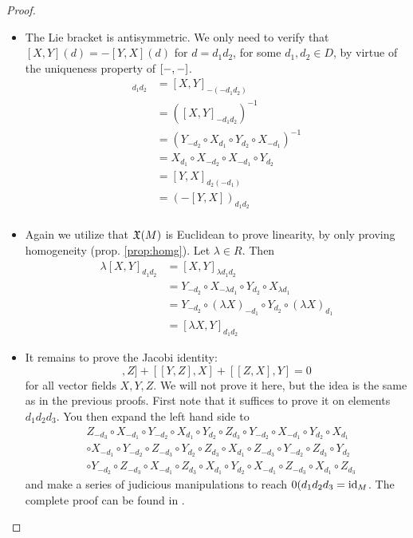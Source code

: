 \begin{proof}
  \begin{itemize}
    \item The Lie bracket is antisymmetric. We only need to verify that \( [X,Y](d) = -[Y,X](d) \) for \( d = d_1d_2 \), for some \( d_1,d_2\in D \), by virtue of the uniqueness property of \( [-,-] \).
      \begin{align*}
	[X,Y]_{d_1d_2} &= [X,Y]_{-(-d_1d_2)}                                                   \\
		       &= \left( [X,Y]_{-d_1d_2} \right)^{-1}                                  \\
		       &= \left( Y_{-d_2}\circ X_{d_1}\circ Y_{d_2}\circ X_{-d_1} \right)^{-1} \\
		       &= X_{d_1}\circ X_{-d_2}\circ X_{-d_1}\circ Y_{d_2}                     \\
		       &= [Y,X]_{d_2(-d_1)}                                                    \\
		       &= \left( -[Y,X] \right)_{d_1d_2}                                       \\
      \end{align*}
    \item Again we utilize that \( \mathfrak X(M) \) is Euclidean to prove linearity, by only proving homogeneity (prop. \ref{prop:homg}). Let \( \lambda\in R \). Then
      \begin{align*}
	\lambda[X,Y]_{d_1d_2} &= [X,Y]_{\lambda d_1d_2}                                               \\
	                      &= Y_{-d_2}\circ X_{-\lambda d_1}\circ Y_{d_2}\circ X_{\lambda d_1}     \\
			      &= Y_{-d_2}\circ (\lambda X)_{-d_1}\circ Y_{d_2}\circ (\lambda X)_{d_1} \\
			      &= [\lambda X,Y]_{d_1d_2}
      \end{align*}
    \item It remains to prove the Jacobi identity:
      \begin{equation*}
	[[X,Y],Z] + [[Y,Z],X] + [[Z,X],Y] = 0
      \end{equation*}
      for all vector fields \( X,Y,Z \). We will not prove it here, but the idea is the same as in the previous proofs. First note that it suffices to prove it on elements \( d_1d_2d_3 \). You then expand the left hand side to
      \begin{align*}
	&Z_{-d_3}\circ X_{-d_1}\circ Y_{-d_2}\circ X_{d_1}\circ Y_{d_2}\circ Z_{d_3}\circ Y_{-d_2}\circ X_{-d_1}\circ Y_{d_2}\circ X_{d_1} \\
        &\circ X_{-d_1}\circ Y_{-d_2}\circ Z_{-d_3}\circ Y_{d_2}\circ Z_{d_3}\circ X_{d_1}\circ Z_{-d_3}\circ Y_{-d_2}\circ Z_{d_3}\circ Y_{d_2} \\
        &\circ Y_{-d_2}\circ Z_{-d_3}\circ X_{-d_1}\circ Z_{d_3}\circ X_{d_1}\circ Y_{d_2}\circ X_{-d_1}\circ Z_{-d_3}\circ X_{d_1}\circ Z_{d_3} 
      \end{align*}
      and make a series of judicious manipulations to reach \( 0(d_1d_2d_3 = \operatorname{id}_M \). The complete proof can be found in \cite{lav96}.
  \end{itemize}
\end{proof}

